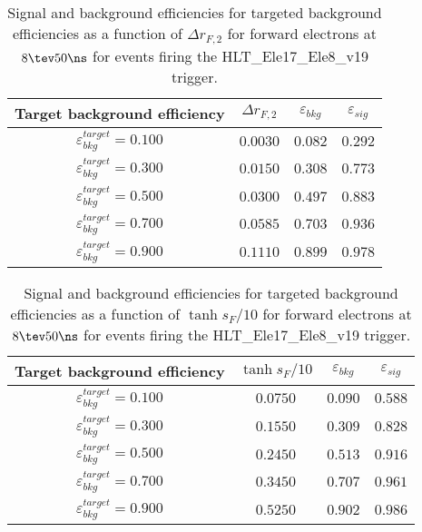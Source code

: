 \clearpage

\begin{table}[!bht]
  \begin{center}
    \begin{tabular}{cccc}
      \hline
      Target background efficiency & $\Delta r_{F,2}$ & $\varepsilon_{bkg}$ & $\varepsilon_{sig}$ \\ 
      \hline
      $\varepsilon_{bkg}^{target} = 0.100$ & $  0.0030$ & $0.082$ & $0.292$ \\
      $\varepsilon_{bkg}^{target} = 0.300$ & $  0.0150$ & $0.308$ & $0.773$ \\
      $\varepsilon_{bkg}^{target} = 0.500$ & $  0.0300$ & $0.497$ & $0.883$ \\
      $\varepsilon_{bkg}^{target} = 0.700$ & $  0.0585$ & $0.703$ & $0.936$ \\
      $\varepsilon_{bkg}^{target} = 0.900$ & $  0.1110$ & $0.899$ & $0.978$ \\
      \hline
    \end{tabular}
    \caption{Signal and background efficiencies for targeted background efficiencies as a function of $\Delta r_{F,2}$ for forward electrons at $8\tev 50\ns$ for events firing the HLT\_Ele17\_Ele8\_v19 trigger.}
    \label{tab:eff_rej_r2F_beam_8_50_trigger_17_8_F}
  \end{center}
\end{table}

\clearpage

\begin{table}[!bht]
  \begin{center}
    \begin{tabular}{cccc}
      \hline
      Target background efficiency & $\tanh{s_F/10}$ & $\varepsilon_{bkg}$ & $\varepsilon_{sig}$ \\ 
      \hline
      $\varepsilon_{bkg}^{target} = 0.100$ & $  0.0750$ & $0.090$ & $0.588$ \\
      $\varepsilon_{bkg}^{target} = 0.300$ & $  0.1550$ & $0.309$ & $0.828$ \\
      $\varepsilon_{bkg}^{target} = 0.500$ & $  0.2450$ & $0.513$ & $0.916$ \\
      $\varepsilon_{bkg}^{target} = 0.700$ & $  0.3450$ & $0.707$ & $0.961$ \\
      $\varepsilon_{bkg}^{target} = 0.900$ & $  0.5250$ & $0.902$ & $0.986$ \\
      \hline
    \end{tabular}
    \caption{Signal and background efficiencies for targeted background efficiencies as a function of $\tanh{s_F/10}$ for forward electrons at $8\tev 50\ns$ for events firing the HLT\_Ele17\_Ele8\_v19 trigger.}
    \label{tab:eff_rej_sF_beam_8_50_trigger_17_8_F}
  \end{center}
\end{table}

